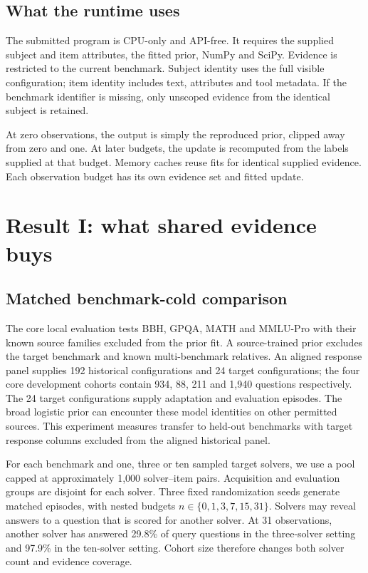 \documentclass{article}
\begin{document}
\subsection{What the runtime uses}
The submitted program is CPU-only and API-free. It requires the supplied subject and item attributes, the fitted prior, NumPy and SciPy. Evidence is restricted to the current benchmark. Subject identity uses the full visible configuration; item identity includes text, attributes and tool metadata. If the benchmark identifier is missing, only unscoped evidence from the identical subject is retained.

At zero observations, the output is simply the reproduced prior, clipped away from zero and one. At later budgets, the update is recomputed from the labels supplied at that budget. Memory caches reuse fits for identical supplied evidence. Each observation budget has its own evidence set and fitted update.

\clearpage
\section{Result I: what shared evidence buys}
\subsection{Matched benchmark-cold comparison}
The core local evaluation tests BBH, GPQA, MATH and MMLU-Pro with their known source families excluded from the prior fit. A source-trained prior excludes the target benchmark and known multi-benchmark relatives. An aligned response panel supplies 192 historical configurations and 24 target configurations; the four core development cohorts contain 934, 88, 211 and 1,940 questions respectively. The 24 target configurations supply adaptation and evaluation episodes. The broad logistic prior can encounter these model identities on other permitted sources. This experiment measures transfer to held-out benchmarks with target response columns excluded from the aligned historical panel.

For each benchmark and one, three or ten sampled target solvers, we use a pool capped at approximately 1,000 solver--item pairs. Acquisition and evaluation groups are disjoint for each solver. Three fixed randomization seeds generate matched episodes, with nested budgets $n\in\{0,1,3,7,15,31\}$. Solvers may reveal answers to a question that is scored for another solver. At 31 observations, another solver has answered 29.8\% of query questions in the three-solver setting and 97.9\% in the ten-solver setting. Cohort size therefore changes both solver count and evidence coverage.
\end{document}
